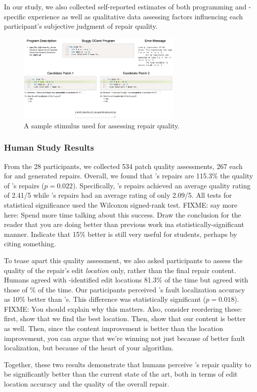 In our study, we also collected self-reported estimates of both programming and
\ocaml-specific experience as well as qualitative data assessing factors
influencing each participant's subjective judgment of repair quality.

\begin{figure}
  \includegraphics[width=8cm]{SampleStimuli.png}
  \caption{A sample stimulus used for assessing repair quality.}
  \label{fig:stimulus}
\end{figure}

\subsubsection{Human Study Results}
\label{subsubsec:study_res}


From the 28 participants, we collected 534 patch quality assessments, 267 each
for \toolname and \seminal generated repairs. Overall, we found that \toolname's
repairs are 115.3\% the quality of \seminal's repairs ($p=0.022$). Specifically,
\toolname's repairs achieved an average quality rating of 2.41/5 while
\seminal's repairs had an average rating of only 2.09/5. All tests for
statistical significance used the Wilcoxon signed-rank test. FIXME: say
more here: Spend more time talking about this success. Draw the conclusion
for the reader that you are doing better than previous work ina
statistically-significant manner. Indicate that 15\% better is still very
useful for students, perhaps by citing something.

To tease apart this quality assessment, we also asked participants to assess
the quality of the repair's edit \emph{location} only, 
rather than the final repair content.
Humans agreed with \toolname-identified edit locations 81.3\%
of the time but agreed with those of \% of the time.
Our participants perceived \toolname's fault localization accuracy
as 10\% better than \seminal's. This difference was statistically significant
($p=0.018$). FIXME: You should explain why this matters. Also, consider
reordering these: first, show that we find the best location. Then, show
that our content is better as well. Then, since the content improvement is
better than the location improvement, you can argue that we're winning not
just because of better fault localization, but because of the heart of your
algorithm.


Together, these two results demonstrate that humans perceive \toolname's repair
quality to be significantly better than the current state of the art, both in
terms of edit location accuracy and the quality of the overall repair.
